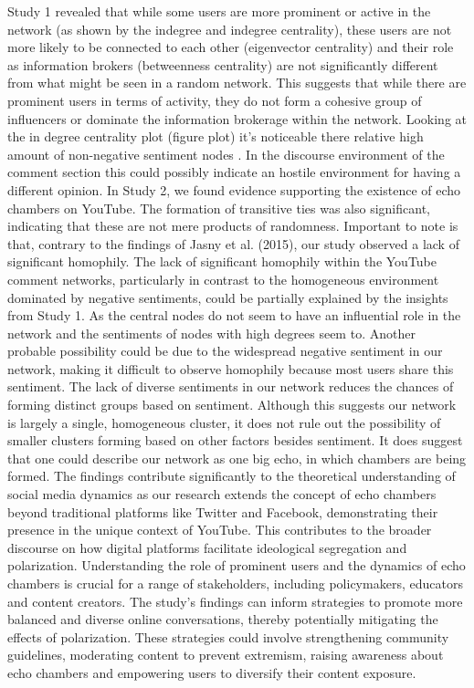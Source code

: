 \documentclass[
  man,floatsintext]{apa6}
\begin{document}
Study 1 revealed that while some users are more prominent or active in the network (as shown by the indegree and indegree centrality), these users are not more likely to be connected to each other (eigenvector centrality) and their role as information brokers (betweenness centrality) are not significantly different from what might be seen in a random network. This suggests that while there are prominent users in terms of activity, they do not form a cohesive group of influencers or dominate the information brokerage within the network. Looking at the in degree centrality plot (figure plot) it's noticeable there relative high amount of non-negative sentiment nodes . In the discourse environment of the comment section this could possibly indicate an hostile environment for having a different opinion.
In Study 2, we found evidence supporting the existence of echo chambers on YouTube. The formation of transitive ties was also significant, indicating that these are not mere products of randomness. Important to note is that, contrary to the findings of Jasny et al. (2015), our study observed a lack of significant homophily. The lack of significant homophily within the YouTube comment networks, particularly in contrast to the homogeneous environment dominated by negative sentiments, could be partially explained by the insights from Study 1. As the central nodes do not seem to have an influential role in the network and the sentiments of nodes with high degrees seem to.
Another probable possibility could be due to the widespread negative sentiment in our network, making it difficult to observe homophily because most users share this sentiment. The lack of diverse sentiments in our network reduces the chances of forming distinct groups based on sentiment. Although this suggests our network is largely a single, homogeneous cluster, it does not rule out the possibility of smaller clusters forming based on other factors besides sentiment. It does suggest that one could describe our network as one big echo, in which chambers are being formed.
The findings contribute significantly to the theoretical understanding of social media dynamics as our research extends the concept of echo chambers beyond traditional platforms like Twitter and Facebook, demonstrating their presence in the unique context of YouTube. This contributes to the broader discourse on how digital platforms facilitate ideological segregation and polarization.
Understanding the role of prominent users and the dynamics of echo chambers is crucial for a range of stakeholders, including policymakers, educators and content creators. The study's findings can inform strategies to promote more balanced and diverse online conversations, thereby potentially mitigating the effects of polarization. These strategies could involve strengthening community guidelines, moderating content to prevent extremism, raising awareness about echo chambers and empowering users to diversify their content exposure.
\end{document}
